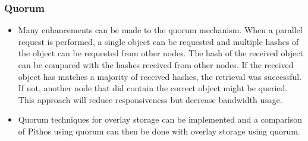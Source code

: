 \subsubsection{Quorum}
\begin{itemize}
\item Many enhancements can be made to the quorum mechanism. When a parallel request is performed, a single object can be requested and multiple hashes of the object can be requested from other nodes. The hash of the received object can be compared with the hashes received from other nodes. If the received object has matches a majority of received hashes, the retrieval was successful. If not, another node that did contain the correct object might be queried. This approach will reduce responsiveness but decrease bandwidth usage.

\item Quorum techniques for overlay storage can be implemented and a comparison of Pithos using quorum can then be done with overlay storage using quorum.
\end{itemize}